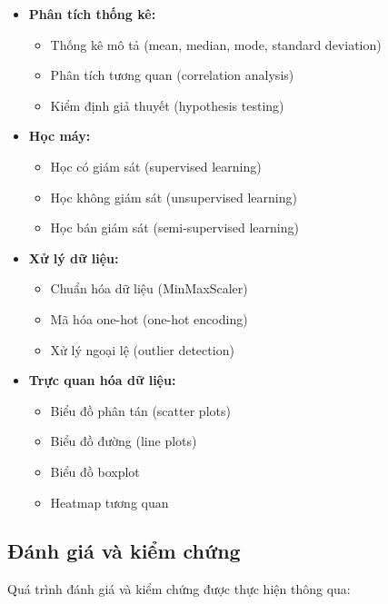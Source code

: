 \begin{itemize}
    \item \textbf{Phân tích thống kê:}
    \begin{itemize}
        \item Thống kê mô tả (mean, median, mode, standard deviation)
        \item Phân tích tương quan (correlation analysis)
        \item Kiểm định giả thuyết (hypothesis testing)
    \end{itemize}
    
    \item \textbf{Học máy:}
    \begin{itemize}
        \item Học có giám sát (supervised learning)
        \item Học không giám sát (unsupervised learning)
        \item Học bán giám sát (semi-supervised learning)
    \end{itemize}
    
    \item \textbf{Xử lý dữ liệu:}
    \begin{itemize}
        \item Chuẩn hóa dữ liệu (MinMaxScaler)
        \item Mã hóa one-hot (one-hot encoding)
        \item Xử lý ngoại lệ (outlier detection)
    \end{itemize}
    
    \item \textbf{Trực quan hóa dữ liệu:}
    \begin{itemize}
        \item Biểu đồ phân tán (scatter plots)
        \item Biểu đồ đường (line plots)
        \item Biểu đồ boxplot
        \item Heatmap tương quan
    \end{itemize}
\end{itemize}

\subsection{Đánh giá và kiểm chứng}

\hspace{0.5cm}Quá trình đánh giá và kiểm chứng được thực hiện thông qua:

